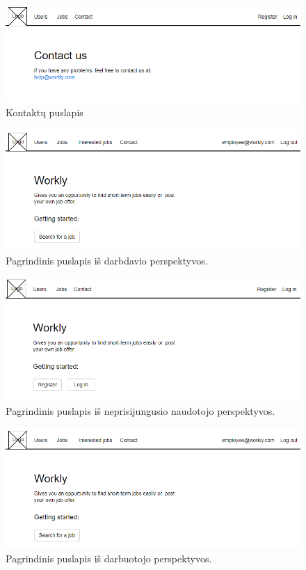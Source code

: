 \documentclass{VUMIFPSkursinis}
\begin{document}
\begin{figure}[H]
\centering
\includegraphics[width=\linewidth, frame]{img/contact.png}
\caption{Kontaktų puslapis}
\end{figure}

\begin{figure}[H]
\centering
\includegraphics[width=\linewidth, frame]{img/employeeHomePage.png}
\caption{Pagrindinis puslapis iš darbdavio perspektyvos.}
\end{figure}

\begin{figure}[H]
\centering
\includegraphics[width=\linewidth, frame]{img/guestHomePage.png}
\caption{Pagrindinis puslapis iš neprisijungusio naudotojo perspektyvos.}
\end{figure}

\begin{figure}[H]
\centering
\includegraphics[width=\linewidth, frame]{img/employeeHomePage.png}
\caption{Pagrindinis puslapis iš darbuotojo perspektyvos.}
\end{figure}
\end{document}
